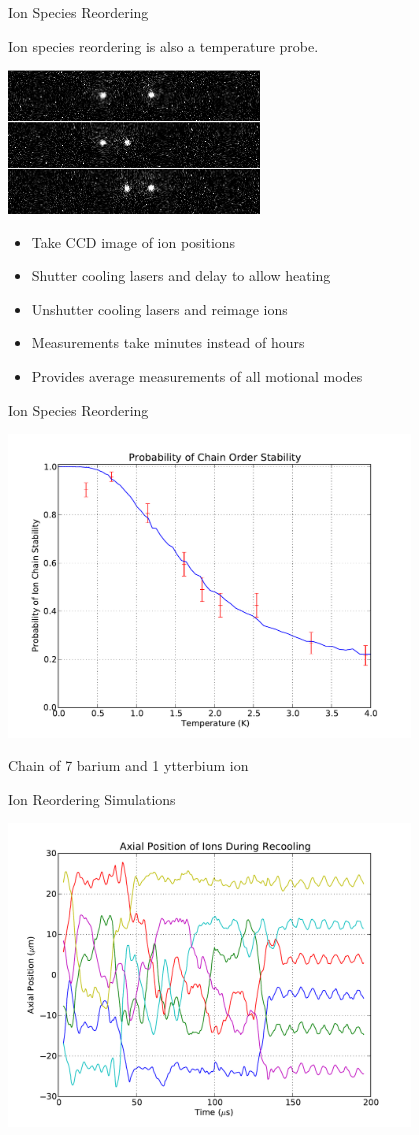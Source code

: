 \documentclass{beamer}
\begin{document}
\begin{frame}{Ion Species Reordering}
	\centerline{\Large Ion species reordering is also a temperature probe.}
	\centerline{\includegraphics[width=0.5\textwidth]{BaYb}}
	\begin{itemize}
		\item Take CCD image of ion positions
		\item Shutter cooling lasers and delay to allow heating
		\item Unshutter cooling lasers and reimage ions
			\hfill \break
		\item Measurements take minutes instead of hours
		\item Provides average measurements of all motional modes
	\end{itemize}
\end{frame}

\begin{frame}{Ion Species Reordering}
	\centerline{\includegraphics[width=0.8\textwidth]{Reordering81}}
	\centerline{\Large Chain of 7 barium and 1 ytterbium ion}
\end{frame}

\begin{frame}{Ion Reordering Simulations}
	\centerline{\includegraphics[width=0.8\textwidth]{ReorderingPositions}}
\end{frame}
\end{document}

